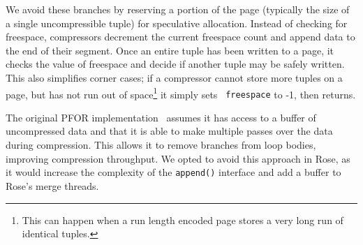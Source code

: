 \documentclass{vldb}
\newcommand{\rows}{Rose\xspace}
\newcommand{\rowss}{Rose's\xspace}
\begin{document}
We avoid these branches by reserving a portion of the page (typically the
size of a single uncompressible tuple) for speculative allocation.
Instead of checking for freespace, compressors decrement the current
freespace count and append data to the end of their segment.
Once an entire tuple has been written to a page,
it checks the value of freespace and decide if another tuple may be
safely written.  This also simplifies corner cases; if a
compressor cannot store more tuples on a page, but has not run out of
space\footnote{This can happen when a run length encoded page stores a
  very long run of identical tuples.} it simply sets {\tt
  freespace} to -1, then returns.



The original PFOR implementation~\cite{pfor} assumes it has access to
a buffer of uncompressed data and that it is able to make multiple
passes over the data during compression.  This allows it to remove
branches from loop bodies, improving compression throughput.  We opted
to avoid this approach in \rows, as it would increase the complexity
of the {\tt append()} interface and add a buffer to \rowss merge threads.


\end{document}
